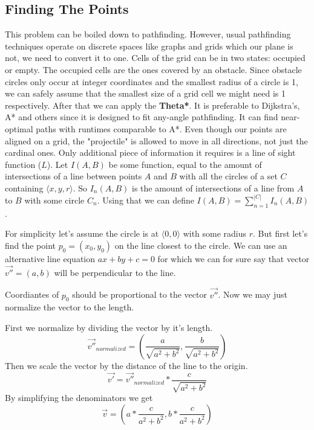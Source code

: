 \documentclass[12pt, titlepage]{article}
\begin{document}
\subsection{Finding The Points}
This problem can be boiled down to pathfinding. However, usual pathfinding
techniques operate on discrete spaces like graphs and grids which our plane
is not, we need to convert it to one. Cells of the grid can be in two states:
occupied or empty. The occupied cells are the ones covered by an obstacle. 
Since obstacle circles only occur at integer coordinates and the smallest
radius of a circle is 1, we can safely assume that the smallest size of a grid
cell we might need is 1 respectively. After that we can apply the \textbf{Theta*}.
It is preferable to Dijkstra's, A* and others since it is designed to fit
any-angle pathfinding. It can find near-optimal paths with runtimes comparable
to A*. Even though our points are aligned on a grid,
the "projectile" is allowed to move in all directions, not just the cardinal ones. 
Only additional piece of information it requires is a line of sight function ($L$).
Let $I(A, B)$ be some function, equal to the amount of intersections of a 
line between points $A$ and $B$  with all the circles of a set $C$ containing 
$\langle x, y, r \rangle$. So $I_n(A, B)$ is the amount of intersections
of a line from $A$ to $B$ with some circle $C_n$. 
Using that we can define $I(A, B) = \sum_{n=1}^{|C|}I_n(A, B)$.

For simplicity let's assume the circle is at $\langle 0, 0 \rangle$ with
some radius $r$.
But first let's find the point $p_0 = (x_0, y_0)$ on the line closest to the circle.
We can use an alternative line equation $ax + by + c = 0$ for which we can for sure say that 
vector $\vec{v''} = (a, b)$ will be perpendicular to the line.

Coordiantes of $p_0$ should be proportional to the vector $\vec{v''}$. 
Now we may just normalize the vector to the length.

First we normalize by dividing the vector by it's length.
\begin{equation}
    \vec{v''}_{normalized}=\left(\frac{a}{\sqrt{a^2 + b^2}}, \frac{b}{\sqrt{a^2 + b^2}} \right)
\end{equation}
Then we scale the vector by the distance of the line to the origin.
\begin{equation}
    \vec{v'}=\vec{v''}_{normalized} * \frac{c}{\sqrt{a^2 + b^2}}
\end{equation}
By simplifying the denominators we get
\begin{equation}
    \vec{v}=\left(a * \frac{c}{a^2 + b^2}, b * \frac{c}{a^2 + b^2}\right)
\end{equation}
\end{document}
